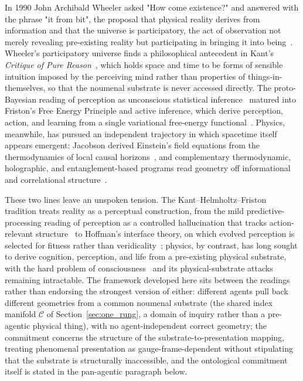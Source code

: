 \documentclass[11pt]{article}
\begin{document}
In 1990 John Archibald Wheeler asked "How come existence?" and answered with the phrase "it from bit", the proposal that physical reality derives from information and that the universe is participatory, the act of observation not merely revealing pre-existing reality but participating in bringing it into being~\cite{Wheeler1990, Wheeler1983}. Wheeler's participatory universe finds a philosophical antecedent in Kant's \emph{Critique of Pure Reason}~\cite{Kant1781}, which holds space and time to be forms of sensible intuition imposed by the perceiving mind rather than properties of things-in-themselves, so that the noumenal substrate is never accessed directly. The proto-Bayesian reading of perception as unconscious statistical inference~\cite{Helmholtz1867} matured into Friston's Free Energy Principle and active inference, which derive perception, action, and learning from a single variational free-energy functional~\cite{Friston2010, Friston2017, parr2022active}. Physics, meanwhile, has pursued an independent trajectory in which spacetime itself appears emergent: Jacobson derived Einstein's field equations from the thermodynamics of local causal horizons~\cite{Jacobson1995}, and complementary thermodynamic, holographic, and entanglement-based programs read geometry off informational and correlational structure~\cite{Padmanabhan2010, Bousso2002, Maldacena1999, VanRaamsdonk2010, MaldacenaSusskind2013, Swingle2012}.

These two lines leave an unspoken tension. The Kant--Helmholtz--Friston tradition treats reality as a perceptual construction, from the mild predictive-processing reading of perception as a controlled hallucination that tracks action-relevant structure~\cite{Clark2016, Seth2021} to Hoffman's interface theory, on which evolved perception is selected for fitness rather than veridicality~\cite{Hoffman2019}; physics, by contrast, has long sought to derive cognition, perception, and life from a pre-existing physical substrate, with the hard problem of consciousness~\cite{Chalmers1995} and its physical-substrate attacks~\cite{HameroffPenrose1996, Tononi2008} remaining intractable. The framework developed here sits between the readings rather than endorsing the strongest version of either: different agents pull back different geometries from a common noumenal substrate (the shared index manifold $\mathcal{C}$ of Section~\ref{sec:one_rung}, a domain of inquiry rather than a pre-agentic physical thing), with no agent-independent correct geometry; the commitment concerns the structure of the substrate-to-presentation mapping, treating phenomenal presentation as gauge-frame-dependent without stipulating that the substrate is structurally inaccessible, and the ontological commitment itself is stated in the pan-agentic paragraph below.
\end{document}

